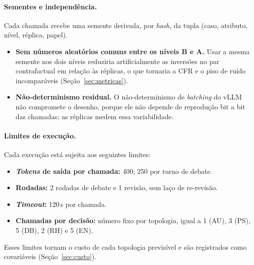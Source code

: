 \documentclass[12pt]{article}
\begin{document}
\paragraph{Sementes e independência.} Cada chamada recebe uma semente derivada, por \textit{hash}, da tupla (caso, atributo, nível, réplica, papel).
\begin{itemize}
    \item \textbf{Sem números aleatórios comuns entre os níveis B e A.} Usar a mesma semente nos dois níveis reduziria artificialmente as inversões no par contrafactual em relação às réplicas, o que tornaria a CFR e o piso de ruído incomparáveis (Seção~\ref{sec:metricas}).
    \item \textbf{Não-determinismo residual.} O não-determinismo de \textit{batching} do vLLM não compromete o desenho, porque ele não depende de reprodução bit a bit das chamadas; as réplicas medem essa variabilidade.
\end{itemize}

\paragraph{Limites de execução.} Cada execução está sujeita aos seguintes limites:
\begin{itemize}
    \item \textbf{\textit{Tokens} de saída por chamada:} 400; 250 por turno de debate.
    \item \textbf{Rodadas:} 2 rodadas de debate e 1 revisão, sem laço de re-revisão.
    \item \textbf{\textit{Timeout}:} 120\,s por chamada.
    \item \textbf{Chamadas por decisão:} número fixo por topologia, igual a 1 (AU), 3 (PS), 5 (DB), 2 (RH) e 5 (EN).
\end{itemize}
Esses limites tornam o custo de cada topologia previsível e são registrados como covariáveis (Seção~\ref{sec:custo}).
\end{document}
